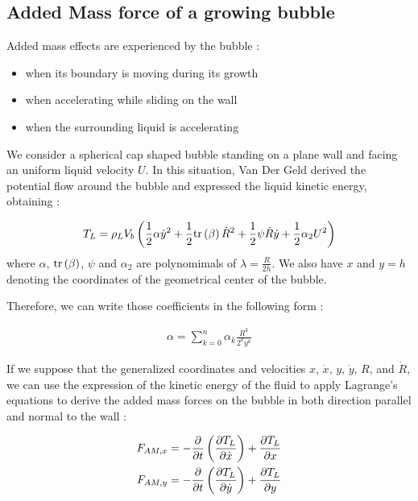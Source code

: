 \npar

\subsection{Added Mass force of a growing bubble}

Added mass effects are experienced by the bubble :

\begin{itemize}
\item when its boundary is moving during its growth
\item when accelerating while sliding on the wall 
\item when the surrounding liquid is accelerating
\end{itemize}

We consider a spherical cap shaped bubble standing on a plane wall and facing an uniform liquid velocity $U$. In this situation, Van Der Geld derived the potential flow around the bubble and expressed the liquid kinetic energy, obtaining : 

\begin{align}
T_{L}=\rho_{L}V_{b}\left(  \frac{1}{2}\alpha \dot{y}^{2} + \frac{1}{2} \mathrm{tr}\left( \beta \right)\dot{R}^{2}+\frac{1}{2}\psi \dot{R}\dot{y} + \frac{1}{2} \alpha_{2} U^{2}  \right)
\end{align}
where $\alpha$, $\mathrm{tr}\left( \beta \right)$, $\psi$ and $\alpha_{2}$ are polynomimals of $\lambda = \frac{R}{2h}$. We also have $x$ and $y=h$ denoting the coordinates of the geometrical center of the bubble.

Therefore, we can write those coefficients in the following form : 

\begin{align}
\alpha = \sum_{k=0}^{n}\alpha_{k}\frac{R^{k}}{2^{k}y^{k}}
\end{align}

If we suppose that the generalized coordinates and velocities $x$, $\dot{x}$, $y$, $\dot{y}$, $R$, and $\dot{R}$, we can use the expression of the kinetic energy of the fluid to apply Lagrange's equations to derive the added mass forces on the bubble in both direction parallel and normal to the wall :

\begin{align}
F_{AM,x}&=-\frac{\partial }{\partial t}\left( \frac{\partial T_{L}}{\partial \dot{x}} \right)+\frac{\partial T_{L}}{\partial x}\\
F_{AM,y}&=-\frac{\partial }{\partial t}\left( \frac{\partial T_{L}}{\partial \dot{y}} \right)+\frac{\partial T_{L}}{\partial y}
\end{align}

